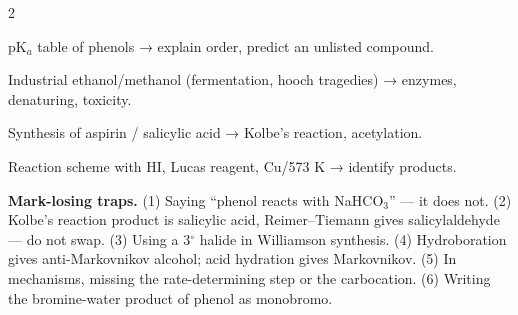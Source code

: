 \documentclass[10pt,a4paper]{extarticle}
\begin{document}
\begin{multicols}{2}
\begin{fl}
\item pK$_a$ table of phenols → explain order, predict an unlisted compound.
\item Industrial ethanol/methanol (fermentation, hooch tragedies) → enzymes, denaturing, toxicity.
\item Synthesis of aspirin / salicylic acid → Kolbe's reaction, acetylation.
\item Reaction scheme with HI, Lucas reagent, Cu/573 K → identify products.
\end{fl}

\begin{tip}\Tip \textbf{Mark-losing traps.} (1) Saying ``phenol reacts with NaHCO$_3$'' — it does not. (2) Kolbe's reaction product is salicylic acid, Reimer--Tiemann gives salicylaldehyde — do not swap. (3) Using a 3$^\circ$ halide in Williamson synthesis. (4) Hydroboration gives anti-Markovnikov alcohol; acid hydration gives Markovnikov. (5) In mechanisms, missing the rate-determining step or the carbocation. (6) Writing the bromine-water product of phenol as monobromo.\end{tip}
\end{multicols}
\begin{tcolorbox}[enhanced,colback=white,colframe=uc,boxrule=0.6pt,arc=2pt,title={\sffamily\bfseries\footnotesize My notes — Ch 7},colbacktitle=uc,coltitle=white,height fill,before skip=4pt]
\end{tcolorbox}
\end{document}
